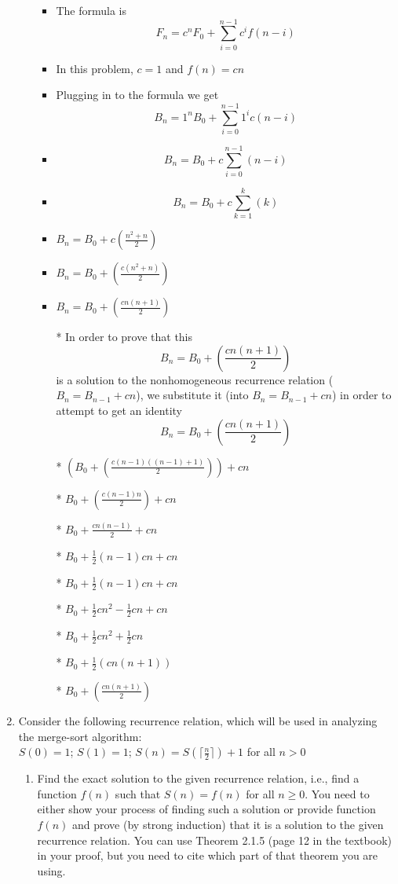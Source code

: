 \begin{enumerate}
\begin{enumerate}
\begin{itemize}
    \item The formula is $$F_{n}=c^{n}F_{0} + \sum\limits_{i=0}^{n-1}c^{i}f(n-i)$$
    \item In this problem, $c=1$ and $f(n)=cn$
    \item Plugging in to the formula we get $$B_{n}=1^{n}B_{0} + \sum\limits_{i=0}^{n-1}1^{i}c(n-i)$$
    \item $$B_{n}=B_{0} + c\sum\limits_{i=0}^{n-1}(n-i)$$
    \item $$B_{n}=B_{0} + c\sum\limits_{k=1}^{k}(k)$$
    \item $B_{n}=B_{0} + c\left(\frac{n^{2}+n}{2}\right)$
    \item $B_{n}=B_{0} + \left(\frac{c\left(n^{2}+n\right)}{2}\right)$
    \item $B_{n}=B_{0} + \left(\frac{cn\left(n+1\right)}{2}\right)$
    \item [*] In order to prove that this $$B_{n}=B_{0} + \left(\frac{cn\left(n+1\right)}{2}\right)$$ is a solution to the nonhomogeneous recurrence relation ($B_{n}=B_{n-1}+cn$), we substitute it (into $B_{n}=B_{n-1}+cn$) in order to attempt to get an identity $$B_{n}=B_{0} + \left(\frac{cn\left(n+1\right)}{2}\right)$$
    \item [*] $\left(B_{0}+\left(\frac{c(n-1)\left((n-1)+1\right)}{2}\right)\right)+cn$
    \item [*] $B_{0}+\left(\frac{c(n-1)n}{2}\right)+cn$
    \item [*] $B_{0}+\frac{cn(n-1)}{2}+cn$
    \item [*] $B_{0}+\frac{1}{2}(n-1)cn+cn$
    \item [*] $B_{0}+\frac{1}{2}(n-1)cn+cn$
    \item [*] $B_{0}+\frac{1}{2}cn^{2}-\frac{1}{2}cn+cn$
    \item [*] $B_{0}+\frac{1}{2}cn^{2}+\frac{1}{2}cn$
    \item [*] $B_{0}+\frac{1}{2}(cn(n+1))$
    \item [*] $B_{0}+\left(\frac{cn(n+1)}{2}\right)$
    \end{itemize} %
  \end{enumerate}
\item Consider the following recurrence relation, which will be used in analyzing the merge-sort algorithm: \\
  $S(0)=1$; $S(1)=1$; $S(n)=S(\lceil \frac{n}{2} \rceil)+1$ for all $n>0$
  \begin{enumerate}
  \item Find the exact solution to the given recurrence relation, i.e., find a function $f(n)$ such that $S(n) = f(n)$ for all $n \geq 0$. You need to either show your process of finding such a solution or provide function $f(n)$ and prove (by strong induction) that it is a solution to the given recurrence relation. You can use Theorem 2.1.5 (page 12 in the textbook) in your proof, but you need to cite which part of that theorem you are using.

\end{enumerate}
\end{enumerate}
